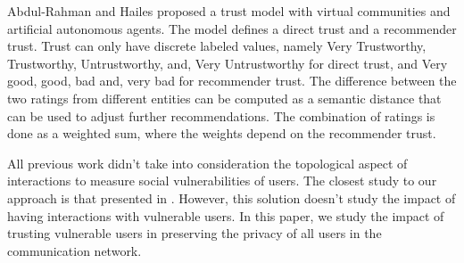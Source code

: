 Abdul-Rahman and Hailes \cite{abdul-rahman_supporting_2000}
	proposed a trust model with virtual communities and artificial autonomous agents.
The model defines a direct trust and a recommender trust.
Trust can only have discrete labeled values,
	namely Very Trustworthy,
	Trustworthy,
	Untrustworthy,
	and,
	Very Untrustworthy for direct trust,
	and Very good,
	good,
	bad and,
	very bad for recommender trust.
The difference between the two ratings from different entities can be computed as a semantic distance that can be used to adjust further recommendations.
The combination of ratings is done as a weighted sum,
	where the weights depend on the recommender trust.


All previous work didn't take into consideration the topological aspect of interactions to measure social vulnerabilities of users.
The closest study to our approach is that presented in \cite{zeng_trustaware_2014}.
However,
	this solution doesn't study the impact of having interactions with vulnerable users.
In this paper,
	we study the impact of trusting vulnerable users in preserving the privacy of all users in the communication network.


